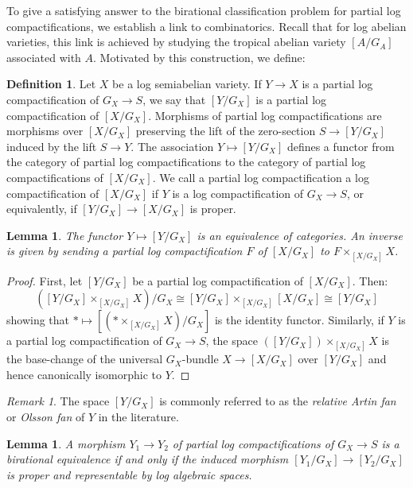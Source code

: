 \documentclass[11pt]{amsart}
\newtheorem{lemma}[theorem]{Lemma}
\theoremstyle{definition}
\newtheorem{definition}[theorem]{Definition}
\theoremstyle{remark}
\newtheorem{remark}[theorem]{Remark}
\begin{document}
To give a satisfying answer to the birational classification problem
for partial log compactifications, we establish a link to combinatorics. Recall
that for log abelian varieties, this link is achieved by studying the tropical
abelian variety $[A/G_A]$ associated with $A$. Motivated by this construction,
we define:

\begin{definition}
	Let $X$ be a log semiabelian variety. If $Y\to X$ is a partial log
	compactification of $G_X\to S$, we say that $[Y/G_X]$ is a partial log compactification
	of $[X/G_X]$. Morphisms of partial log compactifications are morphisms over $[X/G_X]$ preserving
	the lift of the zero-section $S\to [Y/G_X]$ induced by the lift $S\to Y$.
	The association $Y\mapsto [Y/G_X]$
	defines a functor from the category of partial log
	compactifications to the category of partial log compactifications of $[X/G_X]$.
	We call a partial log compactification a log compactification of $[X/G_X]$
	if $Y$ is a log compactification of $G_X\to S$, or equivalently, if $[Y/G_X]\to [X/G_X]$
	is proper.
\end{definition}

\begin{lemma}
	\label{lem:equiv_cat}
	The functor $Y\mapsto [Y/G_X]$ is an equivalence of categories. An inverse
	is given by sending a partial log compactification $F$ of $[X/G_X]$
	to $F\times_{[X/G_X]}X$.
\end{lemma}

\begin{proof}
	First, let $[Y/G_X]$ be a partial log compactification of $[X/G_X]$.
	Then:
	$$([Y/G_X]\times_{[X/G_X]}X)/G_X\cong[Y/G_X]\times_{[X/G_X]}[X/G_X]\cong [Y/G_X]$$
	showing that $\ast\mapsto [(\ast\times_{[X/G_X]}X)/G_X]$ is the
	identity functor. Similarly, if $Y$ is a partial log compactification
	of $G_X\to S$, the space $([Y/G_X])\times_{[X/G_X]}X$ is the
	base-change of the universal $G_X$-bundle $X\to [X/G_X]$
	over $[Y/G_X]$ and hence canonically isomorphic to $Y$.
\end{proof}

\begin{remark}
    The space $[Y/G_X]$ is commonly referred to as the \emph{relative Artin fan} or \emph{Olsson fan} of $Y$ in the literature.
\end{remark}

\begin{lemma}
	\label{lem:bir_on_quot}
	A morphism $Y_1\to Y_2$ of partial log compactifications of $G_X\to S$
	is a birational equivalence if and only if the induced morphism
	$[Y_1/G_X]\to [Y_2/G_X]$ is proper and representable by log algebraic spaces.
\end{lemma}
\end{document}
